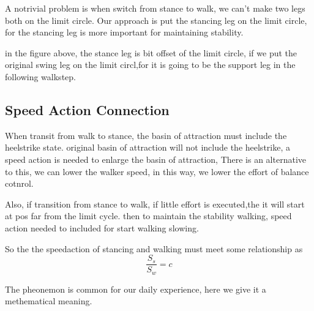 A notrivial problem is when switch from stance to walk, 
we can't make two legs both on the limit circle.
Our approach is put the stancing leg on the limit circle, for the stancing leg is more important for maintaining stability.


in the figure above, the stance leg is bit offset of the limit circle, if we put the original swing leg on the limit circl,for it is going to be the support leg in the following walkstep.


\subsection{Speed Action Connection}
When transit from walk to stance, the basin of attraction must include the heelstrike state.
original basin of attraction will not include the heelstrike, a speed action is needed to enlarge the basin of attraction,
There is an alternative to this, we can lower the walker speed, in this way, we lower the effort of balance cotnrol.

Also, if transition from stance to walk, if little effort is executed,the it will start at pos far from the limit cycle.
then to maintain the stability walking, speed action needed to included for start walking slowing.

So the the speedaction of stancing and walking must meet some relationship as
\[
\frac{S_s}{S_w}=c
\]

The pheonemon is common for our daily experience, here we give it a methematical meaning.






















